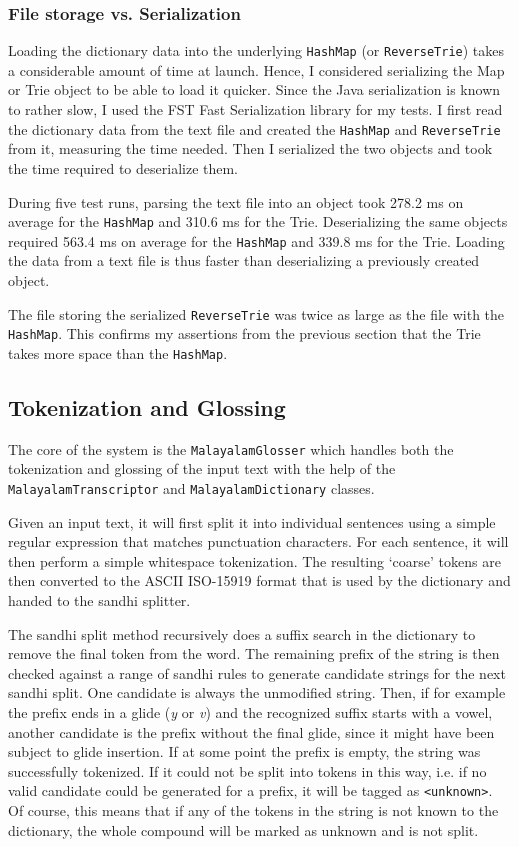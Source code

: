 \documentclass[a4paper]{article}
\newcommand{\typ}[1]{\texttt{#1}}
\begin{document}
\subsubsection*{File storage vs. Serialization}

Loading the dictionary data into the underlying \typ{HashMap} (or \typ{ReverseTrie}) takes a considerable amount of time at launch. Hence, I considered serializing the Map or Trie object to be able to load it quicker. Since the Java serialization is known to rather slow, I used the FST Fast Serialization library for my tests. I first read the dictionary data from the text file and created the \typ{HashMap} and \typ{ReverseTrie} from it, measuring the time needed. Then I serialized the two objects and took the time required to deserialize them.

During five test runs, parsing the text file into an object took 278.2 ms on average for the \typ{HashMap} and 310.6 ms for the Trie. Deserializing the same objects required 563.4 ms on average for the \typ{HashMap} and 339.8 ms for the Trie. Loading the data from a text file is thus faster than deserializing a previously created object.

The file storing the serialized \typ{ReverseTrie} was twice as large as the file with the \typ{HashMap}. This confirms my assertions from the previous section that the Trie takes more space than the \typ{HashMap}.


\subsection{Tokenization and Glossing}

The core of the system is the \typ{MalayalamGlosser} which handles both the tokenization and glossing of the input text with the help of the \typ{MalayalamTranscriptor} and \typ{MalayalamDictionary} classes.

Given an input text, it will first split it into individual sentences using a simple regular expression that matches punctuation characters. For each sentence, it will then perform a simple whitespace tokenization. The resulting `coarse' tokens are then converted to the ASCII ISO-15919 format that is used by the dictionary and handed to the sandhi splitter.

The sandhi split method recursively does a suffix search in the dictionary to remove the final token from the word. The remaining prefix of the string is then checked against a range of sandhi rules to generate candidate strings for the next sandhi split. One candidate is always the unmodified string. Then, if for example the prefix ends in a glide (\textit{y} or \textit{v}) and the recognized suffix starts with a vowel, another candidate is the prefix without the final glide, since it might have been subject to glide insertion. If at some point the prefix is empty, the string was successfully tokenized. If it could not be split into tokens in this way, i.e. if no valid candidate could be generated for a prefix, it will be tagged as \typ{<unknown>}. Of course, this means that if any of the tokens in the string is not known to the dictionary, the whole compound will be marked as unknown and is not split.
\end{document}
